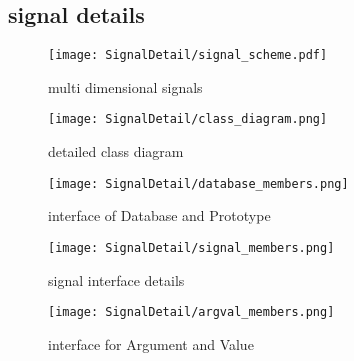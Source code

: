 \subsection{signal details}

\begin{figure}[H]
 \centering
 \texttt{[image: SignalDetail/signal\_scheme.pdf]}
 \caption{multi dimensional signals}
 \label{fig: signalscheme}
\end{figure}

\begin{figure}[H]
 \centering
 \texttt{[image: SignalDetail/class\_diagram.png]}
 \caption{detailed class diagram}
 \label{fig: signal classgraph}
\end{figure}

\begin{figure}[H]
 \centering
 \texttt{[image: SignalDetail/database\_members.png]}
 \caption{interface of Database and Prototype}
 \label{fig: Database members}
\end{figure}

\begin{figure}[H]
 \centering
 \texttt{[image: SignalDetail/signal\_members.png]}
 \caption{signal interface details}
 \label{fig: detailed signal members}
\end{figure}

\begin{figure}[H]
 \centering
 \texttt{[image: SignalDetail/argval\_members.png]}
 \caption{interface for Argument and Value}
 \label{fig: arg and val members}
\end{figure}